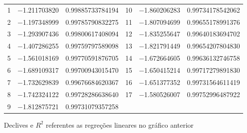 \documentclass[\mainfilename]{subfiles}
\begin{document}
\begin{sectionBox}
\begin{center}
\begin{tabular}{*{6}{C}}
               \color{GraphA12}  1 & \color{GraphA12}\num{-1.211703820} & \color{GraphA12}\num{0.99885733784194}
            &  \color{GraphA23} 10 & \color{GraphA23}\num{-1.860206283} & \color{GraphA23}\num{0.99734178542062}
            \\ \color{GraphA13}  2 & \color{GraphA13}\num{-1.197348999} & \color{GraphA13}\num{0.99785790832275}
            &  \color{GraphA24} 11 & \color{GraphA24}\num{-1.807094699} & \color{GraphA24}\num{0.99655178991376}
            \\ \color{GraphA14}  3 & \color{GraphA14}\num{-1.293907436} & \color{GraphA14}\num{0.99800617408094}
            &  \color{GraphA25} 12 & \color{GraphA25}\num{-1.835255647} & \color{GraphA25}\num{0.99640183694702}
            \\ \color{GraphA15}  4 & \color{GraphA15}\num{-1.407286255} & \color{GraphA15}\num{0.99759797589098}
            &  \color{GraphA26} 13 & \color{GraphA26}\num{-1.821791449} & \color{GraphA26}\num{0.99654207804830}
            \\ \color{GraphA16}  5 & \color{GraphA16}\num{-1.561018169} & \color{GraphA16}\num{0.99770591876705}
            &  \color{GraphA27} 14 & \color{GraphA27}\num{-1.672664605} & \color{GraphA27}\num{0.99636132746758}
            \\ \color{GraphA17}  6 & \color{GraphA17}\num{-1.689109317} & \color{GraphA17}\num{0.99700943015470}
            &  \color{GraphA28} 15 & \color{GraphA28}\num{-1.650415214} & \color{GraphA28}\num{0.99717279891830}
            \\ \color{GraphA18}  7 & \color{GraphA18}\num{-1.732629839} & \color{GraphA18}\num{0.99676684620367}
            &  \color{GraphA29} 16 & \color{GraphA29}\num{-1.651377352} & \color{GraphA29}\num{0.99731564611419}
            \\ \color{GraphA19}  8 & \color{GraphA19}\num{-1.742324122} & \color{GraphA19}\num{0.99728286638640}
            &  \color{GraphA12} 17 & \color{GraphA12}\num{-1.580526007} & \color{GraphA12}\num{0.99752996487922}
            \\ \color{GraphA22}  9 & \color{GraphA22}\num{-1.812875721} & \color{GraphA22}\num{0.99731079357258}
            
            \\\bottomrule
        \end{tabular}
        \caption{Declives e \(R^2\) referentes as regreções lineares no gráfico anterior}
    \end{center}


\end{sectionBox}
\end{document}
